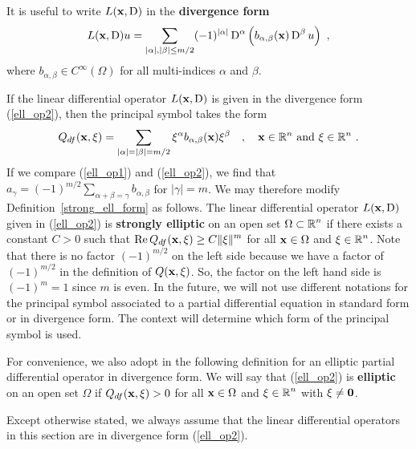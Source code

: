 It is useful to write $L(\mathbf{x},\operatorname{D})$ in the {\bfseries divergence form}%
\begin{equation} \label{ell_op2}
L(\mathbf{x},\operatorname{D})u = \sum_{|\alpha|,|\beta|\leq m/2} (-1)^{|\alpha|} \operatorname{D}^\alpha
\left( b_{\alpha,\beta}(\mathbf{x}) \operatorname{D}^\beta u\right) \ ,
\end{equation}
where $\displaystyle b_{\alpha,\beta} \in C^\infty(\Omega)$ for all
multi-indices $\alpha$ and $\beta$.

If the linear differential operator $L(\mathbf{x},\operatorname{D})$ is given in the
divergence form (\ref{ell_op2}), then the principal symbol takes the
form
\[
Q_{df}(\mathbf{x}, \mathbf{\xi}) = \sum_{|\alpha|=|\beta|=m/2} \mathbf{\xi}^\alpha
b_{\alpha,\beta}(\mathbf{x}) \mathbf{\xi}^\beta \quad , \quad \mathbf{x} \in
\mathbb{R}^n \ \text{and} \ \mathbf{\xi} \in \mathbb{R}^n \ .
\]
If we compare (\ref{ell_op1}) and (\ref{ell_op2}), we find that
$\displaystyle a_\gamma = (-1)^{m/2} \sum_{\alpha+\beta=\gamma} b_{\alpha,\beta}$
for $|\gamma|= m$.
We may therefore modify Definition~\ref{strong_ell_form} as
follows.  The linear differential operator $L(\mathbf{x},\operatorname{D})$ given in
(\ref{ell_op2}) is {\bfseries strongly elliptic}
on an open set $\displaystyle \Omega \subset \mathbb{R}^n$ if there exists a
constant $C>0$ such that
$\displaystyle \operatorname{Re} Q_{df}(\mathbf{x}, \mathbf{\xi}) \geq C \|\mathbf{\xi}\|^m$
for all $\mathbf{x} \in \Omega$ and $\displaystyle \mathbf{\xi} \in \mathbb{R}^n$.
Note that there is no factor $\displaystyle (-1)^{m/2}$ on the left
side because we have a factor of $\displaystyle (-1)^{m/2}$ in the
definition of $Q(\mathbf{x},\mathbf{\xi})$.  So, the factor on the left hand side is
$\displaystyle (-1)^m =1$ since $m$ is even.
In the future, we will not use different notations for the principal
symbol associated to a partial differential equation in standard form
or in divergence form.  The context will determine which form of the
principal symbol is used.

For convenience, we also adopt in the following definition for an
elliptic partial differential operator in divergence form.  We will
say that (\ref{ell_op2}) is {\bfseries elliptic} on an
open set $\Omega$ if $Q_{df}(\mathbf{x}, \mathbf{\xi}) > 0$ for all
$\mathbf{x} \in \Omega$ and $\displaystyle \mathbf{\xi} \in \mathbb{R}^n$ with
$\mathbf{\xi} \neq \mathbf{0}$.

Except otherwise stated, we always assume that the linear differential
operators in this section are in divergence form (\ref{ell_op2}).

